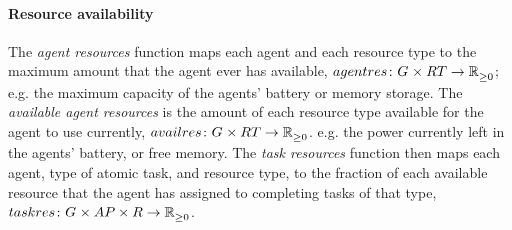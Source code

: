 \paragraph{Resource availability}
\newcommand{\functionAgentResourcesSymbol}[2]{
	\functionSymbol{agentres}
}
\newcommand{\formalAgentResources}[2]{
	\functionFormal{\functionAgentResourcesSymbol{}{}}
	{\setAgents{}{} \times \setResourceType{}{}}
	{\setRealNumbersNonNegative{}{}}
}
\newcommand{\functionAgentResources}[2]{
	\functionSignature{\functionAgentResourcesSymbol{}{}}{\varAgent{#1}{}, \varResourceType{#2}{}}
}
\newcommand{\functionAgentResourcesEnergy}[2]{
	\functionSignature{\functionAgentResourcesSymbol{}{}}{\varAgent{}{}, \varResourceType{e}{}}
}
\newcommand{\functionAgentAvailableResourcesSymbol}[2]{
	\functionSymbol{availres}{#1}{#2}
}
\newcommand{\formalAgentAvailableResources}[2]{
	\functionFormal{\functionAgentAvailableResourcesSymbol{}{}}
	{\setAgents{}{} \times \setResourceType{}{}}
	{\setRealNumbersNonNegative{}{}}
}
\newcommand{\functionAgentAvailableResources}[2]{
	\functionSignature{\functionAgentAvailableResourcesSymbol{}{}}
	{\varAgent{#1}{}, \varResourceType{#2}{}}
}

\newcommand{\functionTaskPathEnergyAvailable}[2]{
	\functionSignature{\functionResourceAvailableSymbol{}{}}
	{\functionTaskArc{}{}, \varResourceTypeEnergy{}{}}
}
\newcommand{\functionTaskResourceAllocationSymbol}[2]{
	\functionSymbol{taskres}{#1}{#2}
}
\newcommand{\formalTaskResourceAllocation}[2]{
	\functionFormal{\functionTaskResourceAllocationSymbol{}{}}
	{\setAgents{}{} \times \setAtomicTaskType{}{} \times \setResource{}{} }
	{\setRealNumbersNonNegative{}{}}
}
\newcommand{\functionTaskResourceAllocation}[2]{
	\functionSignature{\functionTaskResourceAllocationSymbol{}{}}
	{\varAgent{}{}, \varAtomicTaskType{}{}, \varResourceType{}{}}
}
\newcommand{\functionTaskResourceAllocationInstance}[2]{
	\functionSignature{\functionTaskResourceAllocationSymbol{}{}}
	{\varAgent{}{}, \functionAtomicTaskMapping{\varAtomicTask{}{}}{}, \varResourceType{}{}}
}

The \textit{agent resources} function maps each agent and each resource type to the maximum amount that the agent ever has available, $\formalAgentResources{}{}$; e.g. the maximum capacity of the agents' battery or memory storage. 
The \textit{available agent resources} is the amount of each resource type available for the agent to use currently, $\formalAgentAvailableResources{}{}$. e.g. the power currently left in the agents' battery, or free memory. The \textit{task resources} function then maps each agent, type of atomic task, and resource type, to the fraction of each available resource that the agent has assigned to completing tasks of that type, $\formalTaskResourceAllocation{}{}$.

